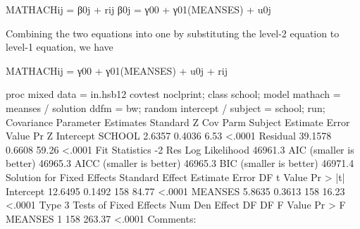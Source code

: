 MATHACHij =  β0j + rij   
β0j =  γ00 + γ01(MEANSES) + u0j

Combining the two equations into one by substituting the level-2 equation to level-1 equation, we have

MATHACHij =   γ00 + γ01(MEANSES) + u0j + rij  

proc mixed data = in.hsb12 covtest noclprint;
   class school;
   model mathach = meanses / solution ddfm = bw;
   random intercept / subject = school;
run;
                  Covariance Parameter Estimates
                                     Standard         Z
Cov Parm      Subject    Estimate       Error     Value        Pr Z
Intercept     SCHOOL       2.6357      0.4036      6.53      <.0001
Residual                  39.1578      0.6608     59.26      <.0001
           Fit Statistics
-2 Res Log Likelihood         46961.3
AIC (smaller is better)       46965.3
AICC (smaller is better)      46965.3
BIC (smaller is better)       46971.4
                   Solution for Fixed Effects
                         Standard
Effect       Estimate       Error      DF    t Value    Pr > |t|
Intercept     12.6495      0.1492     158      84.77      <.0001
MEANSES        5.8635      0.3613     158      16.23      <.0001
        Type 3 Tests of Fixed Effects
              Num     Den
Effect         DF      DF    F Value    Pr > F
MEANSES         1     158     263.37    <.0001
Comments:

